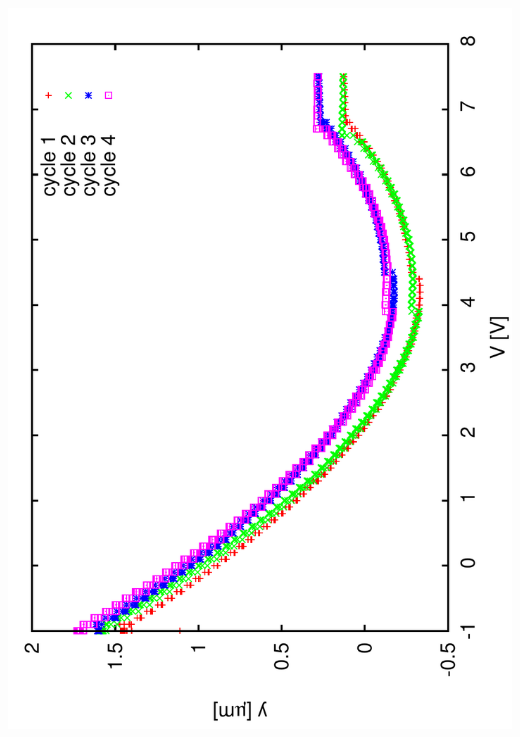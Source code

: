 \documentclass[a4paper,11pt]{book}
\begin{document}
\includegraphics[angle=-90,scale=0.15]{image62.pdf}
\end{document}
